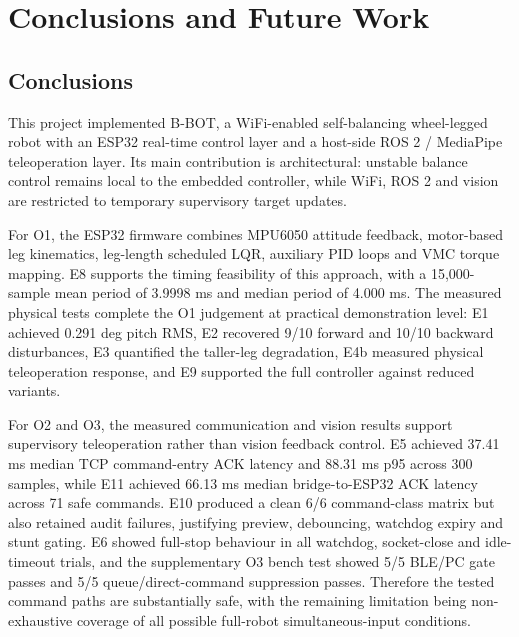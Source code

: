 \documentclass[12pt, a4paper]{article}
\begin{document}
\section{Conclusions and Future Work}

\subsection{Conclusions}

This project implemented B-BOT, a WiFi-enabled self-balancing wheel-legged robot with an ESP32 real-time control layer and a host-side ROS 2 / MediaPipe teleoperation layer. Its main contribution is architectural: unstable balance control remains local to the embedded controller, while WiFi, ROS 2 and vision are restricted to temporary supervisory target updates.

For O1, the ESP32 firmware combines MPU6050 attitude feedback, motor-based leg kinematics, leg-length scheduled LQR, auxiliary PID loops and VMC torque mapping. E8 supports the timing feasibility of this approach, with a 15,000-sample mean period of 3.9998 ms and median period of 4.000 ms. The measured physical tests complete the O1 judgement at practical demonstration level: E1 achieved 0.291 deg pitch RMS, E2 recovered 9/10 forward and 10/10 backward disturbances, E3 quantified the taller-leg degradation, E4b measured physical teleoperation response, and E9 supported the full controller against reduced variants.

For O2 and O3, the measured communication and vision results support supervisory teleoperation rather than vision feedback control. E5 achieved 37.41 ms median TCP command-entry ACK latency and 88.31 ms p95 across 300 samples, while E11 achieved 66.13 ms median bridge-to-ESP32 ACK latency across 71 safe commands. E10 produced a clean 6/6 command-class matrix but also retained audit failures, justifying preview, debouncing, watchdog expiry and stunt gating. E6 showed full-stop behaviour in all watchdog, socket-close and idle-timeout trials, and the supplementary O3 bench test showed 5/5 BLE/PC gate passes and 5/5 queue/direct-command suppression passes. Therefore the tested command paths are substantially safe, with the remaining limitation being non-exhaustive coverage of all possible full-robot simultaneous-input conditions.
\end{document}
